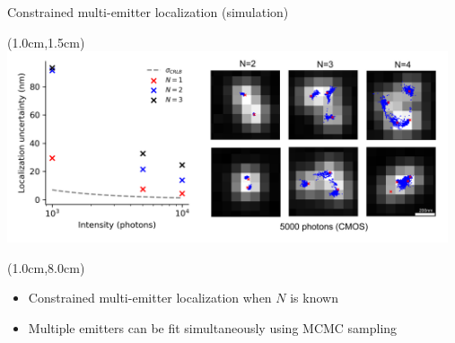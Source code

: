 \documentclass{beamer}					%
\begin{document}
\begin{frame}{Constrained multi-emitter localization (simulation)}

\begin{textblock*}{13cm}(1.0cm,1.5cm)
\includegraphics[width=13cm]{../../spad/spad/media/MultiEmitter.png}
\end{textblock*}

\begin{textblock*}{13cm}(1.0cm,8.0cm)
\begin{itemize}
\item Constrained multi-emitter localization when $N$ is known
\item Multiple emitters can be fit simultaneously using MCMC sampling
\end{itemize}
\end{textblock*}

\end{frame}
\end{document}
